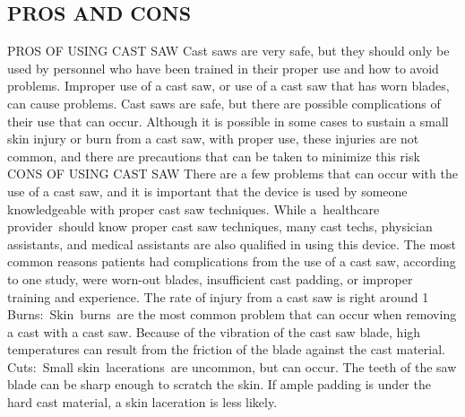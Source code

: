 \documentclass[12pt]{article}
\begin{document}
\subsection{PROS AND CONS}
PROS OF USING CAST SAW
Cast saws are very safe, but they should only be used by personnel who have been trained in their proper use and how to avoid problems. Improper use of a cast saw, or use of a cast saw that has worn blades, can cause problems. Cast saws are safe, but there are possible complications of their use that can occur. Although it is possible in some cases to sustain a small skin injury or burn from a cast saw, with proper use, these injuries are not common, and there are precautions that can be taken to minimize this risk
CONS OF USING CAST SAW
There are a few problems that can occur with the use of a cast saw, and it is important that the device is used by someone knowledgeable with proper cast saw techniques. While a healthcare provider should know proper cast saw techniques, many cast techs, physician assistants, and medical assistants are also qualified in using this device.
The most common reasons patients had complications from the use of a cast saw, according to one study, were worn-out blades, insufficient cast padding, or improper training and experience. The rate of injury from a cast saw is right around 1%
Burns: Skin burns are the most common problem that can occur when removing a cast with a cast saw. Because of the vibration of the cast saw blade, high temperatures can result from the friction of the blade against the cast material. 
Cuts: Small skin lacerations are uncommon, but can occur. The teeth of the saw blade can be sharp enough to scratch the skin. If ample padding is under the hard cast material, a skin laceration is less likely.
\end{document}
